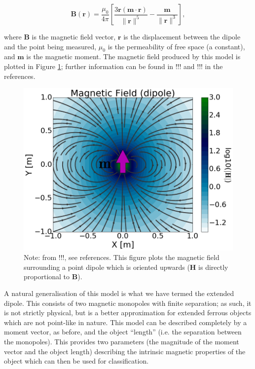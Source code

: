 \documentclass[10pt, a4paper, twocolumn]{article} %
\begin{document}
\begin{equation}
	{\mathbf{B} ({\mathbf{r} }) = {\frac{\mu_{0}}{4\pi}} \left[{\frac {3\mathbf{r} (\mathbf{m} \cdot \mathbf {r} )}{\lVert \mathbf{r} \rVert^{5}}}-{\frac {\mathbf {m} }{\lVert \mathbf{r} \rVert^{3}}} \right],}
\end{equation}

where $\mathbf{B}$ is the magnetic field vector, $\mathbf{r}$ is the displacement between the dipole and the point being measured, $\mu_0$ is the permeability of free space (a constant),  and $\mathbf{m}$ is the magnetic moment.
The magnetic field produced by this model is plotted in Figure \ref{dipole_field}; further information can be found in !!! and !!! in the references.

\begin{figure}
	\includegraphics[width=\linewidth]{Figures/dipole_field.png} %
	\caption{Note: from !!!, see references. This figure plots the magnetic field surrounding a point dipole which is oriented upwards ($\mathbf{H}$ is directly proportional to $\mathbf{B}$).}
	\label{dipole_field}
\end{figure}


A natural generalisation of this model is what we have termed the extended dipole. This consists of two magnetic monopoles with finite separation; as such, it is not strictly physical, but is a better approximation for extended ferrous objects which are not point-like in nature. This model can be described completely by a moment vector, as before, and the object “length” (i.e. the separation between the monopoles). This provides two parameters (the magnitude of the moment vector and the object length) describing the intrinsic magnetic properties of the object which can then be used for classification.
\end{document}
